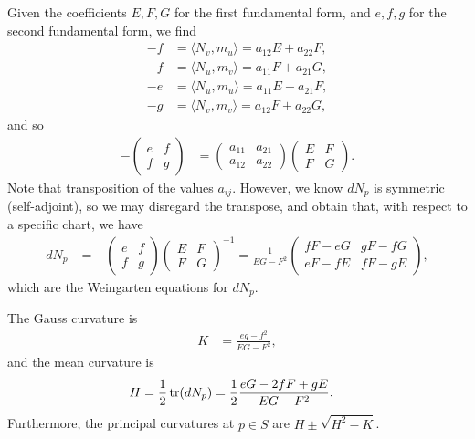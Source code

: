 Given the coefficients $E, F, G$ for the first fundamental form, and $e, f, g$ for the second fundamental form, we find
\begin{align*}
    -f &= \langle N_v, m_u \rangle = a_{12}E + a_{22}F, \\
    -f &= \langle N_u, m_v \rangle = a_{11}F + a_{21}G, \\
    -e &= \langle N_u, m_u \rangle = a_{11}E + a_{21}F, \\
    -g &= \langle N_v, m_v \rangle = a_{12}F + a_{22}G,
\end{align*}
and so
\begin{align*}
    -\begin{pmatrix}
        e & f \\ f & g
    \end{pmatrix} &= \begin{pmatrix}
        a_{11} & a_{21} \\ a_{12} & a_{22}
    \end{pmatrix}\begin{pmatrix}
        E & F \\ F & G
    \end{pmatrix}.
\end{align*}
Note that transposition of the values $a_{ij}$. However, we know $dN_p$ is symmetric (self-adjoint), so we may disregard the transpose, and obtain that, with respect to a specific chart, we have
\begin{align*}
    dN_{p} &= -\begin{pmatrix}
        e & f \\ f & g
    \end{pmatrix}\begin{pmatrix}
        E & F \\ F & G
    \end{pmatrix}^{-1} = \frac{1}{EG - F^2}\begin{pmatrix}
        fF - eG & gF - fG\\
        eF - fE & fF - gE
    \end{pmatrix},
\end{align*}
which are the Weingarten equations for $dN_{p}$.

\begin{cor}
    The Gauss curvature is
    \begin{align*}
        K &= \frac{eg-f^2}{EG-F^2},
    \end{align*}
    and the mean curvature is
    \begin{align*}
        H &= \frac{1}{2}\operatorname{tr}(dN_p) = \frac{1}{2}\frac{eG-2fF+gE}{EG-F^2}.
    \end{align*}
    Furthermore, the principal curvatures at $p \in S$ are $H \pm \sqrt{H^2 - K}$.
\end{cor}

